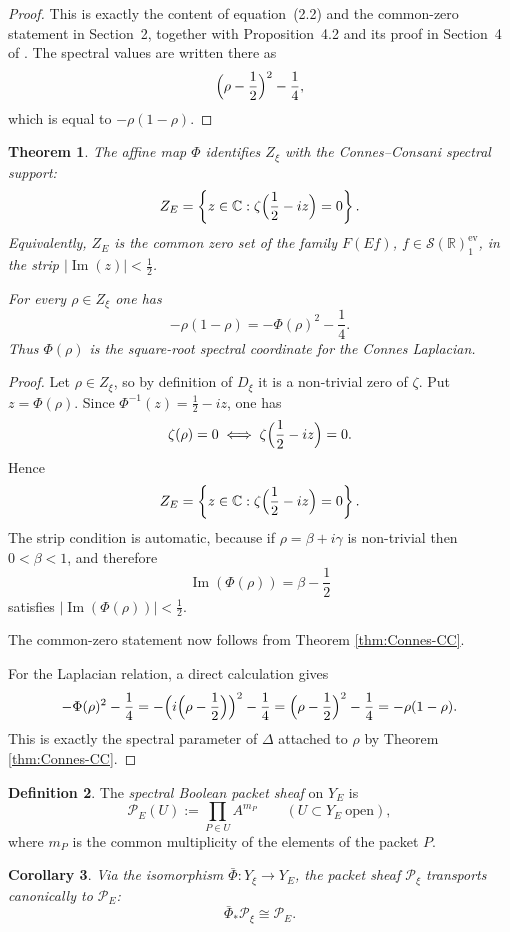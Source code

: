 \documentclass[11pt,a4paper]{article}
\numberwithin{equation}{section}
\newtheorem{theorem}{Theorem}[section]
\newtheorem{corollary}[theorem]{Corollary}
\theoremstyle{definition}
\newtheorem{definition}[theorem]{Definition}
\theoremstyle{remark}
\DeclareMathOperator{\Ima}{Im}
\newcommand{\RR}{\mathbb R}
\newcommand{\CC}{\mathbb C}
\newcommand{\cP}{\mathcal P}
\newcommand{\cS}{\mathcal S}
\begin{document}
\begin{proof}
This is exactly the content of equation~(2.2) and the common-zero statement in Section~2, together with Proposition~4.2 and its proof in Section~4 of \cite{ConnesConsaniCycles}.  The spectral values are written there as
\[
\Bigl(\rho-\frac12\Bigr)^2-\frac14,
\]
which is equal to $-\rho(1-\rho)$.
\end{proof}

\begin{theorem}\label{thm:bridge}
The affine map $\Phi$ identifies $Z_\xi$ with the Connes--Consani spectral support:
\[
Z_E=\left\{z\in\CC:\zeta\Bigl(\frac12-iz\Bigr)=0\right\}.
\]
Equivalently, $Z_E$ is the common zero set of the family $F(Ef)$, $f\in\cS(\RR)^{\mathrm{ev}}_1$, in the strip $|\Ima(z)|<\frac12$.

For every $\rho\in Z_\xi$ one has
\[
-\rho(1-\rho)=-\Phi(\rho)^2-\frac14.
\]
Thus $\Phi(\rho)$ is the square-root spectral coordinate for the Connes Laplacian.
\end{theorem}

\begin{proof}
Let $\rho\in Z_\xi$, so by definition of $D_\xi$ it is a non-trivial zero of $\zeta$.  Put $z=\Phi(\rho)$.  Since $\Phi^{-1}(z)=\frac12-iz$, one has
\[
\zeta(\rho)=0
\iff
\zeta\Bigl(\frac12-iz\Bigr)=0.
\]
Hence
\[
Z_E=\left\{z\in\CC:\zeta\Bigl(\frac12-iz\Bigr)=0\right\}.
\]
The strip condition is automatic, because if $\rho=\beta+i\gamma$ is non-trivial then $0<\beta<1$, and therefore
\[
\Ima(\Phi(\rho))=\beta-\frac12
\]
satisfies $|\Ima(\Phi(\rho))|<\frac12$.

The common-zero statement now follows from Theorem \ref{thm:Connes-CC}.

For the Laplacian relation, a direct calculation gives
\[
-\Phi(\rho)^2-\frac14
=-\Bigl(i\Bigl(\rho-\frac12\Bigr)\Bigr)^2-\frac14
=\Bigl(\rho-\frac12\Bigr)^2-\frac14
=-\rho(1-\rho).
\]
This is exactly the spectral parameter of $\Delta$ attached to $\rho$ by Theorem \ref{thm:Connes-CC}.
\end{proof}

\begin{definition}
The \emph{spectral Boolean packet sheaf} on $Y_E$ is
\[
\cP_E(U):=\prod_{P\in U} A^{m_P}
\qquad (U\subset Y_E\ \text{open}),
\]
where $m_P$ is the common multiplicity of the elements of the packet $P$.
\end{definition}

\begin{corollary}\label{cor:packet-transport}
Via the isomorphism $\bar\Phi:Y_\xi\to Y_E$, the packet sheaf $\cP_\xi$ transports canonically to $\cP_E$:
\[
\bar\Phi_*\cP_\xi\cong \cP_E.
\]
\end{corollary}
\end{document}
